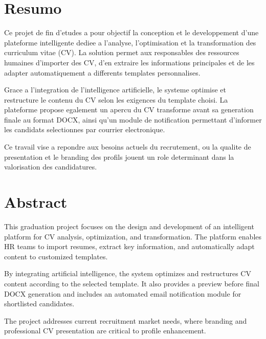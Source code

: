 \thispagestyle{plain}
\chapter*{Resumo}

Ce projet de fin d'etudes a pour objectif la conception et le developpement d'une plateforme intelligente dediee a l'analyse, l'optimisation et la transformation des curriculum vitae (CV). La solution permet aux responsables des ressources humaines d'importer des CV, d'en extraire les informations principales et de les adapter automatiquement a differents templates personnalises.

Grace a l'integration de l'intelligence artificielle, le systeme optimise et restructure le contenu du CV selon les exigences du template choisi. La plateforme propose egalement un apercu du CV transforme avant sa generation finale au format DOCX, ainsi qu'un module de notification permettant d'informer les candidats selectionnes par courrier electronique.

Ce travail vise a repondre aux besoins actuels du recrutement, ou la qualite de presentation et le branding des profils jouent un role determinant dans la valorisation des candidatures.


\MediaOptionLogicBlank

\chapter*{Abstract}

This graduation project focuses on the design and development of an intelligent platform for CV analysis, optimization, and transformation. The platform enables HR teams to import resumes, extract key information, and automatically adapt content to customized templates.

By integrating artificial intelligence, the system optimizes and restructures CV content according to the selected template. It also provides a preview before final DOCX generation and includes an automated email notification module for shortlisted candidates.

The project addresses current recruitment market needs, where branding and professional CV presentation are critical to profile enhancement.


\MediaOptionLogicBlank